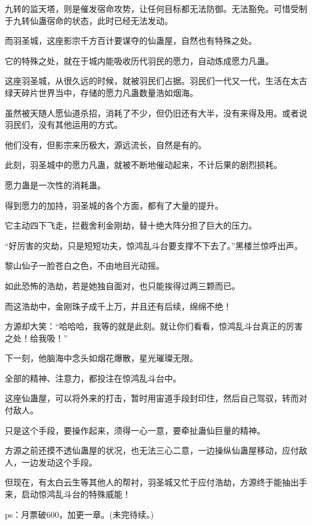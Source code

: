 \begin{this_body}
九转的监天塔，则是催发宿命攻势，让任何目标都无法防御。无法豁免。可惜受制于九转仙蛊宿命的状态，此时已经无法发动。

而羽圣城，这座影宗千方百计要谋夺的仙蛊屋，自然也有特殊之处。

它的特殊之处，就在于城内能吸收历代羽民的愿力，自动炼成愿力凡蛊。

这座羽圣城，从很久远的时候，就被羽民们占据。羽民们一代又一代，生活在太古绿天碎片世界当中，存储的愿力凡蛊数量浩如烟海。

虽然被天随人愿仙道杀招，消耗了不少，但仍旧还有大半，没有来得及用。或者说羽民们，没有其他运用的方式。

他们没有，但影宗来历极大，源远流长，自然是有的。

此刻，羽圣城中的愿力凡蛊，就被不断地催动起来，不计后果的剧烈损耗。

愿力蛊是一次性的消耗蛊。

得到愿力的加持，羽圣城的各个方面，都有了大量的提升。

它主动四下飞走，拦截舍利金刚劫，替十绝大阵分担了巨大的压力。

“好厉害的灾劫，只是短短功夫，惊鸿乱斗台要支撑不下去了。”黑楼兰惊呼出声。

黎山仙子一脸苍白之色，不由地目光动摇。

如此恐怖的浩劫，若是她独自面对，也只能挨得过两三颗而已。

而这浩劫中，金刚珠子成千上万，并且还有后续，绵绵不绝！

方源却大笑：“哈哈哈，我等的就是此刻。就让你们看看，惊鸿乱斗台真正的厉害之处！给我吸！”

下一刻，他脑海中念头如烟花爆散，星光璀璨无限。

全部的精神、注意力，都投注在惊鸿乱斗台中。

这座仙蛊屋，可以将外来的打击，暂时用宙道手段封印住，然后自己驾驭，转而对付敌人。

只是这个手段，要操作起来，须得一心一意，要牵扯蛊仙巨量的精神。

方源之前还摸不透仙蛊屋的状况，也无法三心二意，一边操纵仙蛊屋移动，应付敌人，一边发动这个手段。

但现在，有太白云生等其他人的帮衬，羽圣城又忙于应付浩劫，方源终于能抽出手来，启动惊鸿乱斗台的特殊威能！

ps：月票破600，加更一章。(未完待续。)

\end{this_body}

